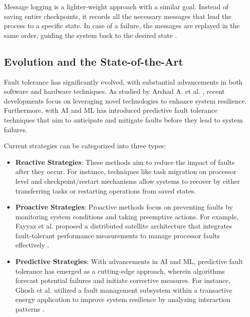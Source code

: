 Message logging is a lighter-weight approach with a similar goal. Instead of saving entire checkpoints, it records all the necessary messages that lead the process to a specific state. In case of a failure, the messages are replayed in the same order, guiding the system back to the desired state \cite{Ledmi2018}.

\subsection{Evolution and the State-of-the-Art}


Fault tolerance has significantly evolved, with substantial advancements in both software and hardware techniques. As studied by Arshad A. et al. \cite{Hussein2021}, recent developments focus on leveraging novel technologies to enhance system resilience. Furthermore, with \gls{AI} and \gls{ML} has introduced predictive fault tolerance techniques that aim to anticipate and mitigate faults before they lead to system failures.

Current strategies can be categorized into three types:

\begin{itemize}
	
	\item \textbf{Reactive Strategies}: These methods aim to reduce the impact of faults after they occur. For instance, techniques like task migration on processor level \cite{Fochi2021} and checkpoint/restart mechanisms \cite{Hussain2021} allow systems to recover by either transferring tasks or restarting operations from saved states.
	      
	\item \textbf{Proactive Strategies}: Proactive methods focus on preventing faults by monitoring system conditions and taking preemptive actions. For example, Fayyaz et al. proposed a distributed satellite architecture that integrates fault-tolerant performance measurements to manage processor faults effectively \cite{Fayyaz2018}.
	      
	\item \textbf{Predictive Strategies}: With advancements in \gls{AI} and \gls{ML}, predictive fault tolerance has emerged as a cutting-edge approach, wherein algorithms forecast potential failures and initiate corrective measures. For instance, Ghosh et al. utilized a fault management subsystem within a transactive energy application to improve system resilience by analyzing interaction patterns \cite{Ghosh2021}.
	      
\end{itemize}

